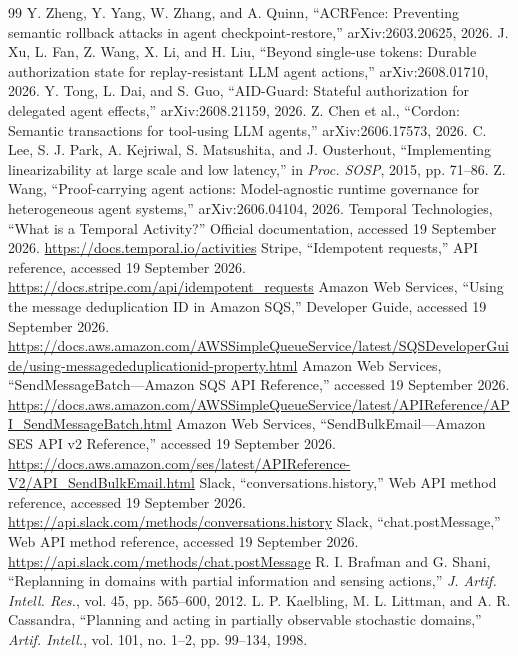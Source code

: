 \documentclass[conference,10pt]{IEEEtran}
\begin{document}
\begin{thebibliography}{99}
 Y. Zheng, Y. Yang, W. Zhang, and A. Quinn, ``ACRFence: Preventing semantic rollback attacks in agent checkpoint-restore,'' arXiv:2603.20625, 2026.
 J. Xu, L. Fan, Z. Wang, X. Li, and H. Liu, ``Beyond single-use tokens: Durable authorization state for replay-resistant LLM agent actions,'' arXiv:2608.01710, 2026.
 Y. Tong, L. Dai, and S. Guo, ``AID-Guard: Stateful authorization for delegated agent effects,'' arXiv:2608.21159, 2026.
 Z. Chen et al., ``Cordon: Semantic transactions for tool-using LLM agents,'' arXiv:2606.17573, 2026.
 C. Lee, S. J. Park, A. Kejriwal, S. Matsushita, and J. Ousterhout, ``Implementing linearizability at large scale and low latency,'' in \emph{Proc. SOSP}, 2015, pp. 71--86.
 Z. Wang, ``Proof-carrying agent actions: Model-agnostic runtime governance for heterogeneous agent systems,'' arXiv:2606.04104, 2026.
 Temporal Technologies, ``What is a Temporal Activity?'' Official documentation, accessed 19 September 2026. \url{https://docs.temporal.io/activities}
 Stripe, ``Idempotent requests,'' API reference, accessed 19 September 2026. \url{https://docs.stripe.com/api/idempotent_requests}
 Amazon Web Services, ``Using the message deduplication ID in Amazon SQS,'' Developer Guide, accessed 19 September 2026. \url{https://docs.aws.amazon.com/AWSSimpleQueueService/latest/SQSDeveloperGuide/using-messagededuplicationid-property.html}
 Amazon Web Services, ``SendMessageBatch---Amazon SQS API Reference,'' accessed 19 September 2026. \url{https://docs.aws.amazon.com/AWSSimpleQueueService/latest/APIReference/API_SendMessageBatch.html}
 Amazon Web Services, ``SendBulkEmail---Amazon SES API v2 Reference,'' accessed 19 September 2026. \url{https://docs.aws.amazon.com/ses/latest/APIReference-V2/API_SendBulkEmail.html}
 Slack, ``conversations.history,'' Web API method reference, accessed 19 September 2026. \url{https://api.slack.com/methods/conversations.history}
 Slack, ``chat.postMessage,'' Web API method reference, accessed 19 September 2026. \url{https://api.slack.com/methods/chat.postMessage}
 R. I. Brafman and G. Shani, ``Replanning in domains with partial information and sensing actions,'' \emph{J. Artif. Intell. Res.}, vol. 45, pp. 565--600, 2012.
 L. P. Kaelbling, M. L. Littman, and A. R. Cassandra, ``Planning and acting in partially observable stochastic domains,'' \emph{Artif. Intell.}, vol. 101, no. 1--2, pp. 99--134, 1998.

\end{thebibliography}
\end{document}
